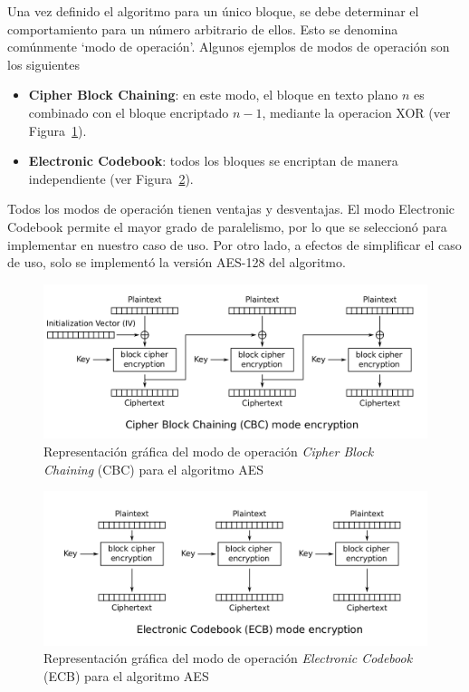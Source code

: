 \documentclass[11pt]{article}
\newcommand{\english}[1]{\textit{#1}}
\begin{document}
Una vez definido el algoritmo para un único bloque, se debe determinar el comportamiento para un número arbitrario de ellos. Esto se denomina comúnmente `modo de operación'. Algunos ejemplos de modos de operación son los siguientes

\begin{itemize}
    \item \textbf{Cipher Block Chaining}: en este modo, el bloque en texto plano $n$ es combinado con el bloque encriptado $n - 1$, mediante la operacion XOR (ver Figura~\ref{fig:aes_cbc}).
    \item \textbf{Electronic Codebook}: todos los bloques se encriptan de manera independiente (ver Figura~\ref{fig:aes_ecb}).
\end{itemize}

Todos los modos de operación tienen ventajas y desventajas. El modo Electronic Codebook permite el mayor grado de paralelismo, por lo que se seleccionó para implementar en nuestro caso de uso. Por otro lado, a efectos de simplificar el caso de uso, solo se implementó la versión AES-128 del algoritmo.

\begin{figure}[h]
    \centering
    \includegraphics[scale=0.2]{resources/aes/cbc.png}
    \caption{Representación gráfica del modo de operación \english{Cipher Block Chaining} (CBC) para el algoritmo AES}
    \label{fig:aes_cbc}
\end{figure}

\begin{figure}[h]
    \centering
    \includegraphics[scale=0.2]{resources/aes/ecb.png}
    \caption{Representación gráfica del modo de operación \english{Electronic Codebook} (ECB) para el algoritmo AES}
    \label{fig:aes_ecb}
\end{figure}
\end{document}

